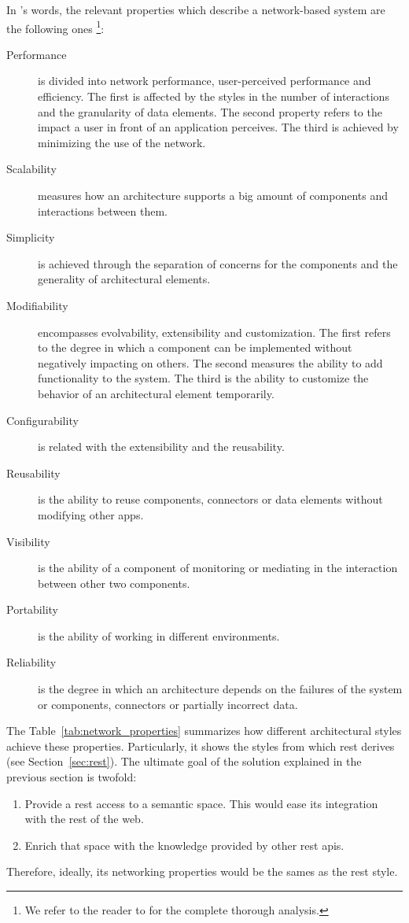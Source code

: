 In \citeauthor{fielding_architectural_2000}'s words, the relevant properties which describe a network-based system are the following ones \footnote{We refer to the reader to \citet{fielding_architectural_2000} for the complete thorough analysis.}:
\begin{description}
  \item[Performance] is divided into network performance, user-perceived performance and efficiency.
		    The first is affected by the styles in the number of interactions and the granularity of data elements.
		    The second property refers to the impact a user in front of an application perceives.
		    The third is achieved by minimizing the use of the network.
  \item[Scalability] measures how an architecture supports a big amount of components and interactions between them.
  \item[Simplicity] is achieved through the separation of concerns for the components and the generality of architectural elements.
  \item[Modifiability] encompasses evolvability, extensibility and customization.
		      The first refers to the degree in which a component can be implemented without negatively impacting on others.
		      The second measures the ability to add functionality to the system.
		      The third is the ability to customize the behavior of an architectural element temporarily.
  \item[Configurability] is related with the extensibility and the reusability.
  \item[Reusability] is the ability to reuse components, connectors or data elements without modifying other apps.
  \item[Visibility] is the ability of a component of monitoring or mediating in the interaction between other two components.
  \item[Portability] is the ability of working in different environments.
  \item[Reliability] is the degree in which an architecture depends on the failures of the system or components, connectors or partially incorrect data.
\end{description}


The Table~\ref{tab:network_properties} summarizes how different architectural styles achieve these properties.
Particularly, it shows the styles from which \ac{rest} derives (see Section~\ref{sec:rest}).
The ultimate goal of the solution explained in the previous section is twofold:
\begin{enumerate}
  \item Provide a \ac{rest} access to a semantic space.
       This would ease its integration with the rest of the web.
  \item Enrich that space with the knowledge provided by other \ac{rest} \acp{api}.
\end{enumerate}
Therefore, ideally, its networking properties would be the sames as the \ac{rest} style.


